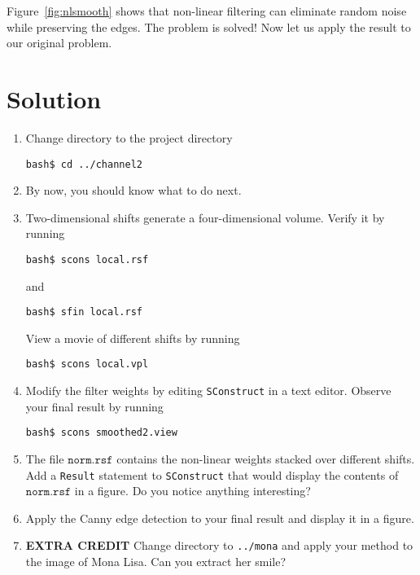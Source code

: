 

Figure~\ref{fig:nlsmooth} shows that non-linear filtering can eliminate random noise while preserving the edges. The problem is solved! Now let us apply the result to our original problem.
 
\lstset{language=c,numbers=left,numberstyle=\tiny,showstringspaces=false}


\section{Solution}

\begin{enumerate}
\item Change directory to the project directory
\begin{verbatim}
bash$ cd ../channel2
\end{verbatim}
\item By now, you should know what to do next.
\item Two-dimensional shifts generate a four-dimensional volume. Verify it by running
\begin{verbatim}
bash$ scons local.rsf
\end{verbatim}
and
\begin{verbatim}
bash$ sfin local.rsf
\end{verbatim}
View a movie of different shifts by running 
\begin{verbatim}
bash$ scons local.vpl
\end{verbatim}
\item Modify the filter weights by editing \texttt{SConstruct} in a text editor.
Observe your final result by running
\begin{verbatim}
bash$ scons smoothed2.view
\end{verbatim}
\item The file $\texttt{norm.rsf}$ contains the non-linear weights stacked over different shifts. Add a \texttt{Result} statement to  \texttt{SConstruct} that would display
the contents of $\texttt{norm.rsf}$ in a figure. Do you notice anything interesting?
\item Apply the Canny edge detection to your final result and display it in a figure.
\item \textbf{EXTRA CREDIT} Change directory to \verb#../mona# and apply your method to the image of Mona Lisa. Can you extract her smile?
\end{enumerate}

